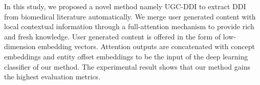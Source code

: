 \documentclass[conference]{IEEEtran}
\begin{document}
In this study, we proposed a novel method namely UGC-DDI to extract DDI from biomedical literature automatically.
We merge user generated content with local contextual information through a full-attention mechanism to provide rich and fresh knowledge.
User generated content is offered in the form of low-dimension embedding vectors.
Attention outputs are concatenated with concept embeddings and entity offset embeddings to be the input of the deep learning classifier of our method.
The experimental result shows that our method gains the highest evaluation metrics.



\end{document}
